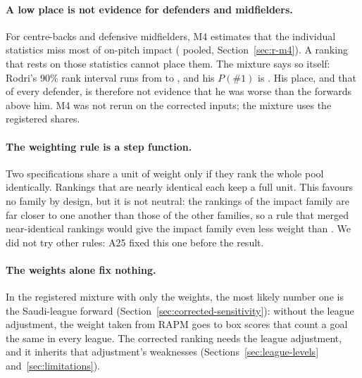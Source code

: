 \documentclass[11pt,a4paper]{article}
\begin{document}
\paragraph{A low place is not evidence for defenders and midfielders.}
For centre-backs and defensive midfielders, M4 estimates that the individual
statistics miss most of on-pitch impact (\ShareHigh{} pooled,
Section~\ref{sec:r-m4}). A ranking that rests on those statistics cannot place
them. The mixture says so itself: Rodri's 90\% rank interval runs from
\CorrectedRodriRankLo{} to \CorrectedRodriRankHi{}, and his $P(\#1)$ is
\CorrectedRodriPFirst{}. His place, and that of every defender, is therefore
not evidence that he was worse than the forwards above him. M4 was not rerun
on the corrected inputs; the mixture uses the registered shares.

\paragraph{The weighting rule is a step function.}
Two specifications share a unit of weight only if they rank the whole pool
identically. Rankings that are nearly identical each keep a full unit. This
favours no family by design, but it is not neutral: the rankings of the impact
family are far closer to one another than those of the other families, so a
rule that merged near-identical rankings would give the impact family even
less weight than \CorrectedWeightImpact{}. We did not try other rules: A25
fixed this one before the result.

\paragraph{The weights alone fix nothing.}
In the registered mixture with only the weights, the most likely number one
is the Saudi-league forward (Section~\ref{sec:corrected-sensitivity}): without
the league adjustment, the weight taken from RAPM goes to box scores that
count a goal the same in every league. The corrected ranking needs the league
adjustment, and it inherits that adjustment's weaknesses
(Sections~\ref{sec:league-levels} and~\ref{sec:limitations}).
\end{document}

